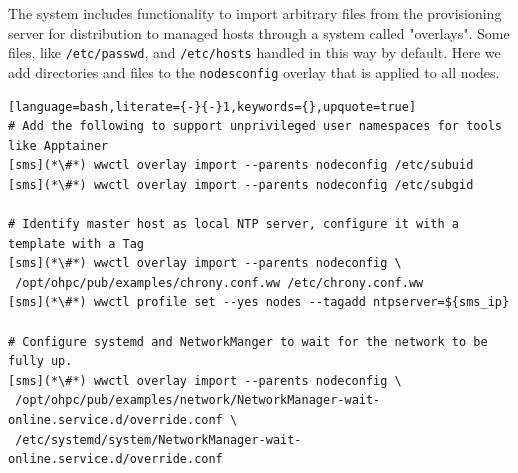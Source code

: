 The \Warewulf{} system includes functionality to import arbitrary files from
the provisioning server for distribution to managed hosts through a system
called "overlays". Some files, like \texttt{/etc/passwd}, and \texttt{/etc/hosts}
handled in this way by default.  Here we add directories and files to the
\texttt{nodesconfig} overlay that is applied to all nodes.

\begin{lstlisting}[language=bash,literate={-}{-}1,keywords={},upquote=true]
# Add the following to support unprivileged user namespaces for tools like Apptainer
[sms](*\#*) wwctl overlay import --parents nodeconfig /etc/subuid
[sms](*\#*) wwctl overlay import --parents nodeconfig /etc/subgid

# Identify master host as local NTP server, configure it with a template with a Tag
[sms](*\#*) wwctl overlay import --parents nodeconfig \
 /opt/ohpc/pub/examples/chrony.conf.ww /etc/chrony.conf.ww
[sms](*\#*) wwctl profile set --yes nodes --tagadd ntpserver=${sms_ip}

# Configure systemd and NetworkManger to wait for the network to be fully up.
[sms](*\#*) wwctl overlay import --parents nodeconfig \
 /opt/ohpc/pub/examples/network/NetworkManager-wait-online.service.d/override.conf \
 /etc/systemd/system/NetworkManager-wait-online.service.d/override.conf
\end{lstlisting}
